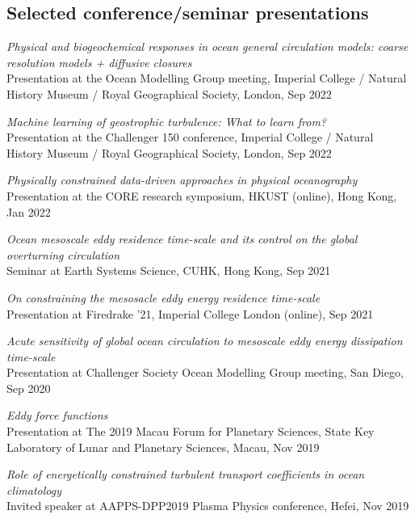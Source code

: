 \documentclass[letterpaper]{article}
\renewenvironment{itemize}{
  \begin{list}{}{
    \setlength{\leftmargin}{1.5em}
  }
}{
  \end{list}
}
\begin{document}
\subsection*{Selected conference/seminar presentations}
\begin{itemize}

\item[--] \textit{Physical and biogeochemical responses in ocean general circulation models: coarse resolution models + diffusive closures}\\
Presentation at the Ocean Modelling Group meeting, Imperial College / Natural History Museum / Royal Geographical Society, London, Sep 2022

\item[--] \textit{Machine learning of geostrophic turbulence: What to learn from?}\\
Presentation at the Challenger 150 conference, Imperial College / Natural History Museum / Royal Geographical Society, London, Sep 2022

\item[--] \textit{Physically constrained data-driven approaches in physical oceanography}\\
Presentation at the CORE research symposium, HKUST (online), Hong Kong, Jan 2022

\item[--] \textit{Ocean mesoscale eddy residence time-scale and its control on the global overturning circulation}\\
Seminar at Earth Systems Science, CUHK, Hong Kong, Sep 2021

\item[--] \textit{On constraining the mesosacle eddy energy residence time-scale}\\
Presentation at Firedrake '21, Imperial College London (online), Sep 2021

\item[--] \textit{Acute sensitivity of global ocean circulation to mesoscale eddy energy dissipation time-scale}\\
Presentation at Challenger Society Ocean Modelling Group meeting, San Diego, Sep 2020

\item[--] \textit{Eddy force functions}\\
Presentation at The 2019 Macau Forum for Planetary Sciences, State Key
Laboratory of Lunar and Planetary Sciences, Macau, Nov 2019

\item[--] \textit{Role of energetically constrained turbulent transport
coefficients in ocean climatology}\\
Invited speaker at AAPPS-DPP2019 Plasma Physics conference, Hefei, Nov 2019

\end{itemize}
\end{document}
